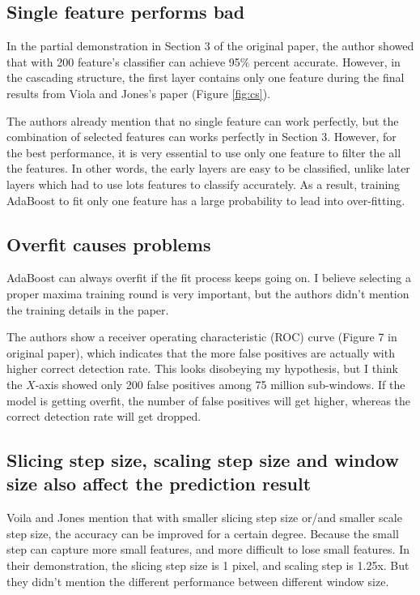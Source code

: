 \documentclass[10pt,twocolumn,letterpaper]{article}
\begin{document}
\subsection{Single feature performs bad}
In the partial demonstration in Section 3 of the original paper, the author showed that with 200 feature's classifier can achieve 95\% percent accurate.
However, in the cascading structure, the first layer contains only one feature during the final results from Viola and Jones's paper (Figure \ref{fig:cs}).

The authors already mention that no single feature can work perfectly, but the combination of selected features can works perfectly in Section 3.
However, for the best performance, it is very essential to use only one feature to filter the all the features.
In other words, the early layers are easy to be classified, unlike later layers which had to use lots features to classify accurately.
As a result, training AdaBoost to fit only one feature has a large probability to lead into over-fitting.

\subsection{Overfit causes problems}
AdaBoost can always overfit if the fit process keeps going on.
I believe selecting a proper maxima training round is very important, but the authors didn't mention the training details in the paper.

The authors show a receiver operating characteristic (ROC) curve (Figure 7 in original paper), which indicates that the more false positives are actually with higher correct detection rate.
This looks disobeying my hypothesis, but I think the $X$-axis showed only 200 false positives among 75 million sub-windows.
If the model is getting overfit, the number of false positives will get higher, whereas the correct detection rate will get dropped.

\subsection{Slicing step size, scaling step size and window size also affect the prediction result}
Voila and Jones mention that with smaller slicing step size or/and smaller scale step size, the accuracy can be improved for a certain degree.
Because the small step can capture more small features, and more difficult to lose small features.
In their demonstration, the slicing step size is 1 pixel, and scaling step is 1.25x.
But they didn't mention the different performance between different window size.
\end{document}

